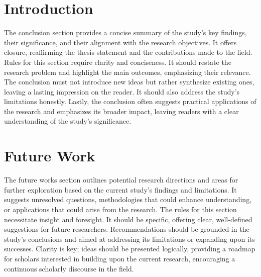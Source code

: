 % 
\section{Introduction}
\label{conclusion:introduction}
% 
The conclusion section provides a concise summary of the study's key findings, their significance, and their alignment with the research objectives. It offers closure, reaffirming the thesis statement and the contributions made to the field. Rules for this section require clarity and conciseness. It should restate the research problem and highlight the main outcomes, emphasizing their relevance. The conclusion must not introduce new ideas but rather synthesize existing ones, leaving a lasting impression on the reader. It should also address the study's limitations honestly. Lastly, the conclusion often suggests practical applications of the research and emphasizes its broader impact, leaving readers with a clear understanding of the study's significance.


% 
\section{Future Work}
\label{conclusion:future}
% 
The future works section outlines potential research directions and areas for further exploration based on the current study's findings and limitations. It suggests unresolved questions, methodologies that could enhance understanding, or applications that could arise from the research. The rules for this section necessitate insight and foresight. It should be specific, offering clear, well-defined suggestions for future researchers. Recommendations should be grounded in the study's conclusions and aimed at addressing its limitations or expanding upon its successes. Clarity is key; ideas should be presented logically, providing a roadmap for scholars interested in building upon the current research, encouraging a continuous scholarly discourse in the field.
